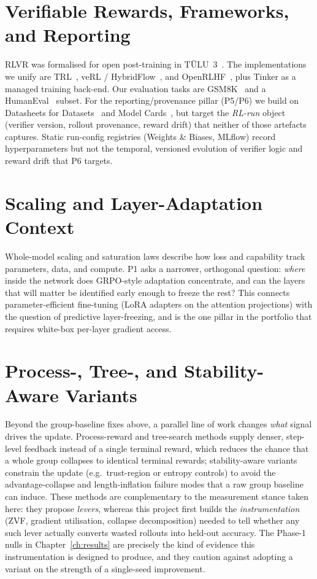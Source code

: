 \documentclass[12pt,a4paper]{report}
\begin{document}
\section{Verifiable Rewards, Frameworks, and Reporting}
RLVR was formalised for open post-training in T\"ULU~3~\cite{lambert2024tulu3}. The
implementations we unify are TRL~\cite{vonwerra2020trl}, veRL /
HybridFlow~\cite{sheng2024hybridflow}, and OpenRLHF~\cite{hu2024openrlhf}, plus
Tinker as a managed training back-end. Our evaluation tasks are
GSM8K~\cite{cobbe2021gsm8k} and a HumanEval~\cite{chen2021humaneval} subset. For the
reporting/provenance pillar (P5/P6) we build on Datasheets for
Datasets~\cite{gebru2021datasheets} and Model Cards~\cite{mitchell2019modelcards},
but target the \emph{RL-run} object (verifier version, rollout provenance, reward
drift) that neither of those artefacts captures. Static run-config registries
(Weights \& Biases, MLflow) record hyperparameters but not the temporal, versioned
evolution of verifier logic and reward drift that P6 targets.

\section{Scaling and Layer-Adaptation Context}
Whole-model scaling and saturation laws describe how loss and capability track
parameters, data, and compute. P1 asks a narrower, orthogonal question: \emph{where}
inside the network does GRPO-style adaptation concentrate, and can the layers that
will matter be identified early enough to freeze the rest? This connects
parameter-efficient fine-tuning (LoRA adapters on the attention projections) with
the question of predictive layer-freezing, and is the one pillar in the portfolio
that requires white-box per-layer gradient access.

\section{Process-, Tree-, and Stability-Aware Variants}
Beyond the group-baseline fixes above, a parallel line of work changes \emph{what}
signal drives the update. Process-reward and tree-search methods supply denser,
step-level feedback instead of a single terminal reward, which reduces the chance
that a whole group collapses to identical terminal rewards; stability-aware variants
constrain the update (e.g.\ trust-region or entropy controls) to avoid the
advantage-collapse and length-inflation failure modes that a raw group baseline can
induce. These methods are complementary to the measurement stance taken here: they
propose \emph{levers}, whereas this project first builds the \emph{instrumentation}
(ZVF, gradient utilisation, collapse decomposition) needed to tell whether any such
lever actually converts wasted rollouts into held-out accuracy. The Phase-1 nulls in
Chapter~\ref{ch:results} are precisely the kind of evidence this instrumentation is
designed to produce, and they caution against adopting a variant on the strength of a
single-seed improvement.
\end{document}
